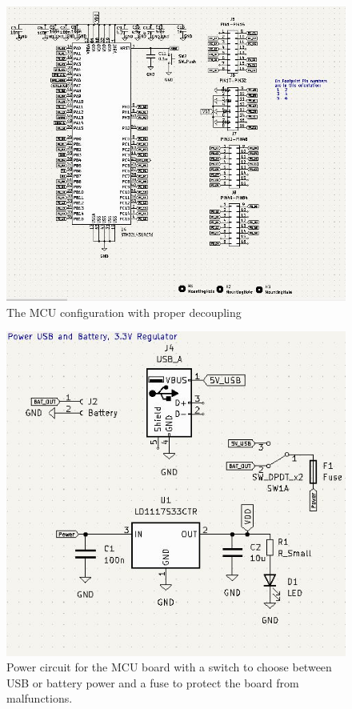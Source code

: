 \begin{figure} [H]
\begin{center}
\includegraphics[scale=0.65]{images/MCU.jpg}
   \caption{The MCU configuration with proper decoupling}
    \label{fig:MCU}
\end{center}
\end{figure}

\begin{figure} [H]
\begin{center}
\includegraphics[scale=0.7]{images/Powercirc.jpg}
   \caption{Power circuit for the MCU board with a switch to choose between USB or battery power and a fuse to protect the board from malfunctions.}
    \label{fig:MCUpower}
\end{center}
\end{figure}

